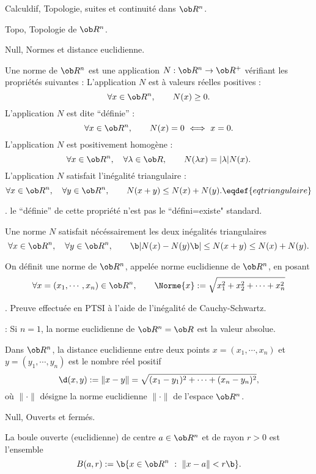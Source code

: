 %

\Chapter Calculdif, Topologie, suites et continuité dans $\ob R^n$.

\Section Topo, Topologie de $\ob R^n$. 

\Subsection Null, Normes et distance euclidienne. 

\Definition [$n\ge1$]
Une norme de $\ob R^n$ est une application $N:\ob R^n\to\ob R^+$ vérifiant les propriétés suivantes : 
\Bullet L'application $N$ est à valeurs réelles positives :
$$
\forall x\in\ob R^n, \qquad N(x)\ge0.
$$
\Bullet L'application $N$ est dite ``définie'' :
$$
\forall x\in\ob R^n, \qquad N(x)=0\ \Longleftrightarrow\ x=0.
$$
\Bullet L'application $N$ est positivement homogène :
$$
\forall x\in\ob R^n, \quad \forall \lambda\in\ob R,\qquad N(\lambda x)=|\lambda|N(x).
$$
\Bullet L'application $N$ satisfait l'inégalité triangulaire :
$$
\forall x\in\ob R^n, \quad\forall y\in\ob R^n, \qquad N(x+y)\le N(x)+N(y).\eqdef{eqtriangulaire}
$$

. le ``définie'' de cette propriété n'est pas le ``défini=existe" standard. 
\medskip 

\noindent
{} Une norme $N$ satisfait nécéssairement les deux inégalités triangulaires 
$$
\forall x\in\ob R^n, \quad \forall y\in\ob R^n, \qquad\b|N(x)-N(y)\b|\le N(x+y)\le N(x)+N(y).
$$

\Propriete [$n\ge1$] On définit une norme de $\ob R^n$, appelée norme euclidienne de $\ob R^n$, en posant 
$$
\forall x=(x_1,\cdots, x_n)\in\ob R^n, \qquad \Norme{x}:=\sqrt{x_1^2+x_2^2+\cdots+x_n^2}
$$

\Demonstration. Preuve effectuée en PTSI à l'aide de l'inégalité de Cauchy-Schwartz.\CQFD

\Remarque : Si $n=1$, la norme euclidienne de $\ob R^n=\ob R$ est la valeur absolue. 
\bigskip


\Definition [$n\ge1$]
Dans $\ob R^n$, la distance euclidienne entre deux points $x=(x_1,\cdots,x_n)$ et $y=(y_1,\cdots,y_n)$ 
est le nombre réel positif 
$$
\d(x,y):=\|x-y\|=\sqrt{(x_1-y_1)^2+\cdots+(x_n-y_n)^2}, 
$$
où $\|\cdot\|$ désigne la norme euclidienne $\|\cdot\|$ de l'espace $\ob R^n$. 


\Subsection Null, Ouverts et fermés. 

La boule ouverte (euclidienne) de centre $a\in\ob R^n$ et de rayon $r>0$ est l'ensemble 
$$
\sc B(a,r):=\b\{x\in\ob R^n\ :\ \|x-a\|<r\b\}.
$$


